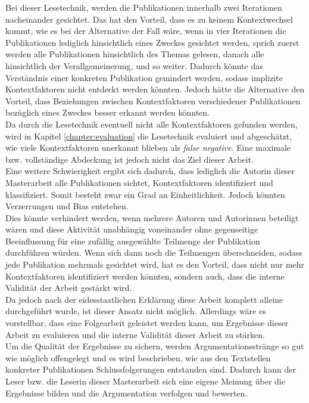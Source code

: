 Bei dieser Lesetechnik, werden die Publikationen innerhalb zwei Iterationen nacheinander gesichtet. Das hat den Vorteil, dass es zu keinem Kontextwechsel kommt, wie es bei der Alternative der Fall wäre, wenn in vier Iterationen die Publikationen lediglich hinsichtlich eines Zweckes gesichtet werden, sprich zuerst werden alle Publikationen hinsichtlich des Themas gelesen, danach alle hinsichtlich der Verallgemeinerung, und so weiter. Dadurch könnte das Verständnis einer konkreten Publikation gemindert werden, sodass implizite Kontextfaktoren nicht entdeckt werden könnten. Jedoch hätte die Alternative den Vorteil, dass Beziehungen zwischen Kontextfaktoren verschiedener Publikationen bezüglich eines Zweckes besser erkannt werden könnten. \\

Da durch die Lesetechnik eventuell nicht alle Kontextfaktoren gefunden werden, wird in Kapitel \ref{chapter:evaluation} die Lesetechnik evaluiert und abgeschätzt, wie viele Kontextfaktoren unerkannt blieben als \textit{false negative}. Eine maximale bzw. vollständige Abdeckung ist jedoch nicht das Ziel dieser Arbeit. \\

Eine weitere Schwierigkeit ergibt sich dadurch, dass lediglich die Autorin dieser Masterarbeit alle Publikationen sichtet, Kontextfaktoren identifiziert und klassifiziert. Somit besteht zwar ein Grad an Einheitlichkeit. Jedoch könnten Verzerrungen und Bias entstehen. \\
Dies könnte verhindert werden, wenn mehrere Autoren und Autorinnen beteiligt wären und diese Aktivität unabhängig voneinander ohne gegenseitige Beeinflussung für eine zufällig ausgewählte Teilmenge der Publikation durchführen würden. Wenn sich dann noch die Teilmengen überschneiden, sodass jede Publikation mehrmals gesichtet wird, hat es den Vorteil, dass nicht nur mehr Kontextfaktoren identifiziert werden könnten, sondern auch, dass die interne Validität der Arbeit gestärkt wird. \\
Da jedoch nach der eidesstaatlichen Erklärung diese Arbeit komplett alleine durchgeführt wurde, ist dieser Ansatz nicht möglich. Allerdings wäre es vorstellbar, dass eine Folgearbeit geleistet werden kann, um Ergebnisse dieser Arbeit zu evaluieren und die interne Validität dieser Arbeit zu stärken. \\

Um die Qualität der Ergebnisse zu sichern, werden Argumentationsstränge so gut wie möglich offengelegt und es wird beschrieben,
wie aus den Textstellen konkreter Publikationen Schlussfolgerungen entstanden sind. Dadurch kann der Leser bzw. die Leserin dieser Masterarbeit sich eine eigene Meinung über die Ergebnisse bilden und die Argumentation verfolgen und bewerten. \\

